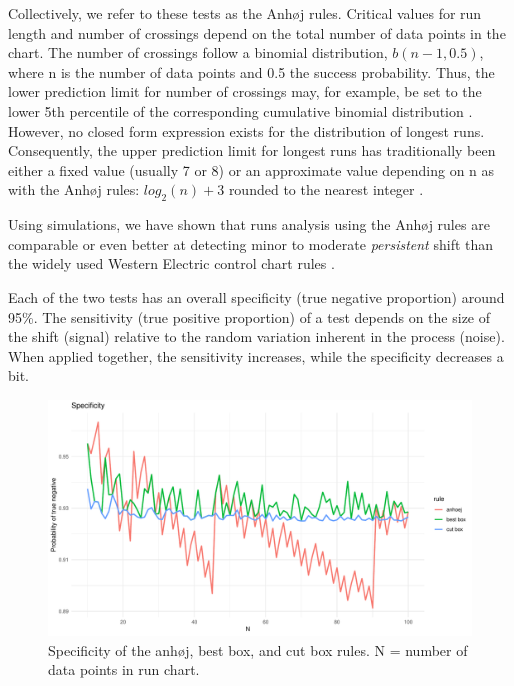 Collectively, we refer to these tests as the Anhøj rules. Critical
values for run length and number of crossings depend on the total number
of data points in the chart. The number of crossings follow a binomial
distribution, \(b(n - 1, 0.5)\), where n is the number of data points
and 0.5 the success probability. Thus, the lower prediction limit for
number of crossings may, for example, be set to the lower 5th percentile
of the corresponding cumulative binomial distribution \citep{chen2010}.
However, no closed form expression exists for the distribution of
longest runs. Consequently, the upper prediction limit for longest runs
has traditionally been either a fixed value (usually 7 or 8)
\citep{carey2002a} or an approximate value depending on n as with the
Anhøj rules: \(log_2(n) + 3\) rounded to the nearest integer
\citep{schilling2012}.

Using simulations, we have shown that runs analysis using the Anhøj
rules are comparable or even better at detecting minor to moderate
\emph{persistent} shift than the widely used Western Electric control
chart rules \citep{anhoej2018}.

Each of the two tests has an overall specificity (true negative
proportion) around 95\%. The sensitivity (true positive proportion) of a
test depends on the size of the shift (signal) relative to the random
variation inherent in the process (noise). When applied together, the
sensitivity increases, while the specificity decreases a bit.

\begin{figure}[htbp]
  \centering
  \includegraphics[width=\textwidth]{fig_spec.pdf}
  \caption{Specificity of the anhøj, best box, and cut box rules. N = number of data points in run chart. }
  \label{figure:spec}
\end{figure}

